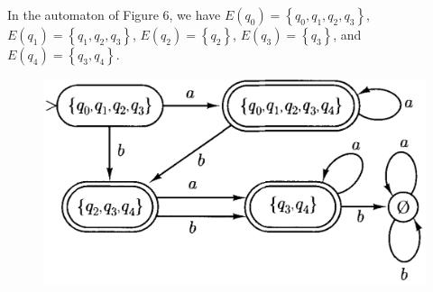 \begin{examplebreak}{}
  In the automaton of Figure 6, we have $E(q_0) = \left\{ q_0, q_1, q_2, q_3  \right\}$, $E(q_1) = \left\{ {q_1, q_2, q_3} \right\}$, $E(q_2) = \left\{ q_2 \right\}$, $E(q_3) = \left\{ q_3 \right\}$, and $E(q_4) = \left\{ q_3, q_4 \right\}$.
\end{examplebreak}


\begin{figure}[t]
  \centering
  \includegraphics[width=.5\textwidth]{img/Fig2.10.png}
  \caption{}
\end{figure}


